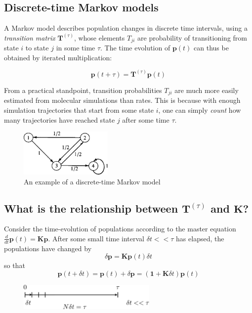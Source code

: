 \documentclass[11pt, oneside]{article}   	%
\begin{document}
\newpage

\subsection*{Discrete-time Markov models}


A Markov model describes population changes in discrete time intervals, using a \textit{transition matrix} $\mathbf{T}^{(\tau)}$, whose elements $T_{ji}$ are probability of transitioning from state $i$ to state $j$ in some time $\tau$.  The time evolution of $\mathbf{p}(t)$ can thus be obtained by iterated multiplication:

$$\mathbf{p}(t+\tau) = \mathbf{T}^{(\tau)}\mathbf{p}(t)$$

From a practical standpoint, transition probabilities $T_{ji}$ are much more easily estimated from molecular simulations than rates. This is because with enough simulation trajectories that start from some state $i$, one can simply \textit{count} how many trajectories have reached state $j$ after some time $\tau$.

\begin{figure}[htbp]
\begin{center}
\includegraphics[width=0.4\textwidth]{markov}
\caption{\label{fig:markov}An example of a discrete-time Markov model}
\end{center}
\end{figure}


\subsection*{What is the relationship between $\mathbf{T}^{(\tau)}$ and $\mathbf{K}$?}

Consider the time-evolution of populations according to the master equation $\frac{d}{dt}\mathbf{p}(t) = \mathbf{K} \mathbf{p}$. After some small time interval $\delta t << \tau$ has elapsed, the populations have changed by
$$\delta \mathbf{p} = \mathbf{K}\mathbf{p}(t) \delta t$$
so that 
$$\mathbf{p}(t+\delta t) = \mathbf{p}(t) + \delta \mathbf{p} = (\mathbf{1} + \mathbf{K} \delta t)\mathbf{p}(t)$$


\begin{figure}[htbp]
\begin{center}
\includegraphics[width=0.6\textwidth]{tau-chopped}
\caption{\label{fig:tau-chopped}}
\end{center}
\end{figure}
\end{document}
